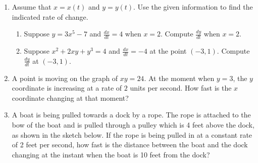 \documentclass[12pt]{article}
\newif\ifans
\begin{document}
\begin{enumerate}

\item Assume that $x=x(t)$ and $y=y(t)$.  Use the given information to find the indicated rate of change.

\begin{enumerate}

\item Suppose $y=3x^5-7$ and $\frac{dx}{dt}=4$ when $x=2$.  Compute $\frac{dy}{dt}$ when $x=2$.

\ifans{\fbox{$960$}} \fi

\item Suppose $x^2+2xy+y^3=4$ and $\frac{dx}{dt}=-4$ at the point $(-3,1)$.  Compute $\frac{dy}{dt}$ at $(-3,1)$.

\ifans{\fbox{$\frac{16}{3}$}} \fi

\end{enumerate}

\item A point is moving on the graph of $xy=24$.  At the moment when $y=3$, the $y$ coordinate is increasing at a rate of $2$ units per second.  How fast is the $x$ coordinate changing at that moment?

\ifans{\fbox{$-\frac{16}{3}$ units per second}} \fi

\item A boat is being pulled towards a dock by a rope.  The rope is attached to the bow of the boat and is pulled through a pulley which is 4 feet above the dock, as shown in the sketch below.  If the rope is being pulled in at a constant rate of 2 feet per second, how fast is the distance between the boat and the dock changing at the instant when the boat is 10 feet from the dock?


\end{enumerate}
\end{document}
